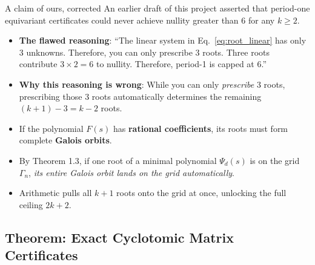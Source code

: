 \documentclass[11pt]{article}
\begin{document}
\begin{callbox}{A claim of ours, corrected}
An earlier draft of this project asserted that period-one equivariant certificates could never achieve nullity greater than $6$ for any $k \ge 2$.
\begin{itemize}[leftmargin=*,nosep]
  \item \textbf{The flawed reasoning}: ``The linear system in Eq.~\eqref{eq:root_linear} has only 3 unknowns. Therefore, you can only prescribe 3 roots. Three roots contribute $3 \times 2 = 6$ to nullity. Therefore, period-1 is capped at 6.''
  \item \textbf{Why this reasoning is wrong}: While you can only \emph{prescribe} 3 roots, prescribing those 3 roots automatically determines the remaining $(k+1) - 3 = k - 2$ roots.
  \item If the polynomial $F(s)$ has \textbf{rational coefficients}, its roots must form complete \textbf{Galois orbits}.
  \item By Theorem 1.3, if one root of a minimal polynomial $\Psi_d(s)$ is on the grid $\Gamma_n$, \emph{its entire Galois orbit lands on the grid automatically}.
  \item Arithmetic pulls all $k+1$ roots onto the grid at once, unlocking the full ceiling $2k+2$.
\end{itemize}
\end{callbox}

\subsection{Theorem: Exact Cyclotomic Matrix Certificates}
\end{document}

